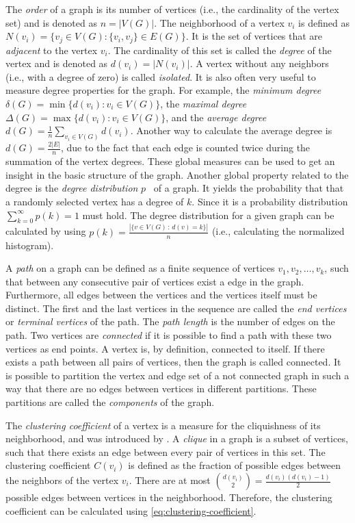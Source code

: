 The \emph{order} of a graph is its number of vertices (i.e., the cardinality of the vertex set) and is denoted as \(n = |V(G)|\).
The neighborhood of a vertex \(v_i\) is defined as \(N(v_i) = \{v_j \in V(G) : \{v_i, v_j \} \in E(G)\}\).
It is the set of vertices that are \emph{adjacent} to the vertex \(v_i\).
The cardinality of this set is called the \emph{degree} of the vertex and is denoted as \(d(v_i) = |N(v_i)|\).
A vertex without any neighbors (i.e., with a degree of zero) is called \emph{isolated}.
It is also often very useful to measure degree properties for the graph.
For example, the \emph{minimum degree} \(\delta(G) = \min\{d(v_i) : v_i \in V(G)\}\), the \emph{maximal degree} \(\Delta(G) = \max\{d(v_i) : v_i \in V(G)\}\), and the \emph{average degree} \(d(G) = \frac{1}{n} \sum_{v_i \in V(G)} d(v_i)\).
Another way to calculate the average degree is \(d(G) = \frac{2|E|}{n}\), due to the fact that each edge is counted twice during the summation of the vertex degrees.
These global measures can be used to get an insight in the basic structure of the graph.
Another global property related to the degree is the \emph{degree distribution} \(p\)~\cite{Barabasi2016} of a graph.
It yields the probability that that a randomly selected vertex has a degree of \(k\).
Since it is a probability distribution \(\sum_{k=0}^\infty p(k) = 1\) must hold.
The degree distribution for a given graph can be calculated by using \(p(k) = \frac{|\{v \in V(G) \,:\, d(v) = k\}|}{n}\) (i.e., calculating the normalized histogram).

A \emph{path} on a graph can be defined as a finite sequence of vertices \(v_1,v_2,\dots,v_k\), such that between any consecutive pair of vertices exist a edge in the graph.
Furthermore, all edges between the vertices and the vertices itself must be distinct.
The first and the last vertices in the sequence are called the \emph{end vertices} or \emph{terminal vertices} of the path.
The \emph{path length} is the number of edges on the path.
Two vertices are \emph{connected} if it is possible to find a path with these two vertices as end points.
A vertex is, by definition, connected to itself.
If there exists a path between all pairs of vertices, then the graph is called connected.
It is possible to partition the vertex and edge set of a not connected graph in such a way that there are no edges between vertices in different partitions.
These partitions are called the \emph{components} of the graph.

The \emph{clustering coefficient} of a vertex is a measure for the cliquishness of its neighborhood, and was introduced by \citet{Watts1998}.
A \emph{clique} in a graph is a subset of vertices, such that there exists an edge between every pair of vertices in this set.
The clustering coefficient \(C(v_i)\) is defined as the fraction of possible edges between the neighbors of the vertex \(v_i\).
There are at most \(\binom{d(v_i)}{2} = \frac{d(v_i)(d(v_i) - 1)}{2}\) possible edges between vertices in the neighborhood.
Therefore, the clustering coefficient can be calculated using \autoref{eq:clustering-coefficient}.

